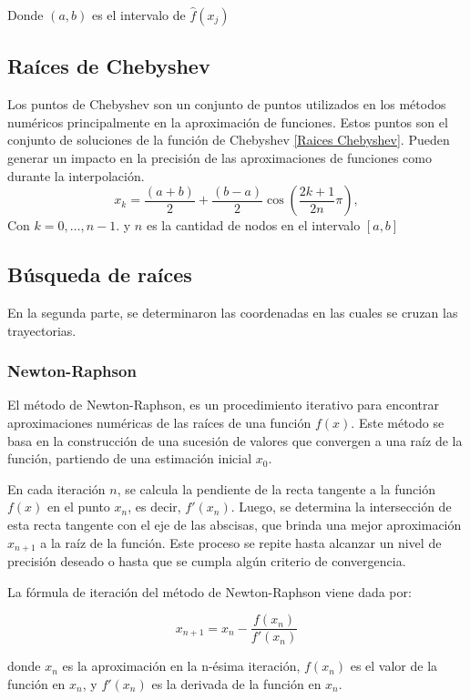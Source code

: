 \documentclass[12pt,a4]{article} %
\begin{document}
\begin{multicols}{2}
Donde $(a, b)$ es el intervalo de $\hat{f}(x_j)$


\subsection{Raíces de Chebyshev}
Los puntos de Chebyshev son un conjunto de puntos utilizados en los métodos numéricos principalmente en la aproximación de funciones. Estos puntos son el conjunto de soluciones de la función de Chebyshev \eqref{Raices Chebyshev}. Pueden generar un impacto en la precisión de las aproximaciones de funciones como durante la interpolación. 
\begin{equation}
    x_{k} = \frac{(a+b)}{2} + \frac{(b-a)}{2} \cos \left( \frac{2k+1}{2n} \pi \right),   
    \label{Raices Chebyshev}
\end{equation}
Con $ k = 0, \ldots, n-1.$ y $n$ es la cantidad de nodos en el intervalo $[a,b]$

\subsection{Búsqueda de raíces}
En la segunda parte, se determinaron las coordenadas en las cuales se cruzan las trayectorias.
\subsubsection{Newton-Raphson}
El método de Newton-Raphson, es un procedimiento iterativo para encontrar aproximaciones numéricas de las raíces de una función $f(x)$. Este método se basa en la construcción de una sucesión de valores que convergen a una raíz de la función, partiendo de una estimación inicial $x_0$.

En cada iteración $n$, se calcula la pendiente de la recta tangente a la función $f(x)$ en el punto $x_n$, es decir, $f'(x_n)$. Luego, se determina la intersección de esta recta tangente con el eje de las abscisas, que brinda una mejor aproximación $x_{n+1}$ a la raíz de la función. Este proceso se repite hasta alcanzar un nivel de precisión deseado o hasta que se cumpla algún criterio de convergencia.

La fórmula de iteración del método de Newton-Raphson viene dada por:

\begin{equation}
    x_{n+1} = x_n - \frac{f(x_n)}{f'(x_n)}
\end{equation}

donde $x_n$ es la aproximación en la n-ésima iteración, $f(x_n)$ es el valor de la función en $x_n$, y $f'(x_n)$ es la derivada de la función en $x_n$. 

\end{multicols}
\end{document}
